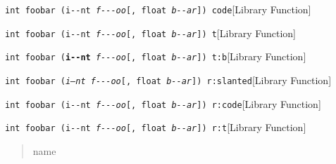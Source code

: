 \documentclass{book}
\begin{document}
%
\noindent\texttt{int foobar (\texttt{i{-}{-}nt} \textsl{f{-}{-}{-}oo}[, float \textsl{b{-}{-}ar}]) code}\hfill[Library Function]



%
\noindent\texttt{int foobar (\texttt{i{-}{-}nt} \textsl{f{-}{-}{-}oo}[, float \textsl{b{-}{-}ar}]) t}\hfill[Library Function]



%
\noindent\texttt{int foobar (\texttt{\textbf{i{-}{-}nt}} \textsl{f{-}{-}{-}oo}[, float \textsl{b{-}{-}ar}]) t:b}\hfill[Library Function]



%
\noindent\texttt{int foobar (\textnormal{\textsl{i--nt}} \textsl{f{-}{-}{-}oo}[, float \textsl{b{-}{-}ar}]) r:slanted}\hfill[Library Function]



%
\noindent\texttt{int foobar (\textnormal{\texttt{i{-}{-}nt}} \textsl{f{-}{-}{-}oo}[, float \textsl{b{-}{-}ar}]) r:code}\hfill[Library Function]



%
\noindent\texttt{int foobar (\textnormal{\texttt{i{-}{-}nt}} \textsl{f{-}{-}{-}oo}[, float \textsl{b{-}{-}ar}]) r:t}\hfill[Library Function]



%
\begin{quote}
\unskip{\parskip=0pt\noindent}%
name
\end{quote}
\end{document}
